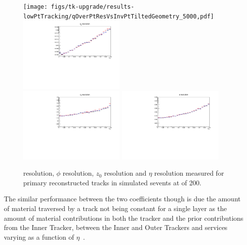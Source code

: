 \begin{figure}[htb]
\centering
\texttt{[image: figs/tk-upgrade/results-lowPtTracking/qOverPtResVsInvPtTiltedGeometry\_5000,pdf]}
\includegraphics[width=0.47\textwidth]{figs/tk-upgrade/results-lowPtTracking/phi0ResVsInvPtTiltedGeometry_5000.pdf}
\\
\includegraphics[width=0.47\textwidth]{figs/tk-upgrade/results-lowPtTracking/z0ResVsInvPtTiltedGeometry_5000.pdf}
\includegraphics[width=0.47\textwidth]{figs/tk-upgrade/results-lowPtTracking/etaResVsInvPtTiltedGeometry_5000.pdf}
\caption{\pt resolution, $\phi$ resolution, $z_{0}$ resolution and $\eta$ resolution measured for primary reconstructed tracks in simulated s\ttbar events at \PU of 200.}
\label{fig:kfHelixParametersResVsInvPt}
\end{figure}

The similar performance between the two coefficients though is due the amount of material traversed by a track not being constant for a single layer as the amount of material contributions in both the tracker and the prior contributions from the Inner Tracker, between the Inner and Outer Trackers and services varying as a function of $\eta$~\cite{P2TrackerTDR}.

